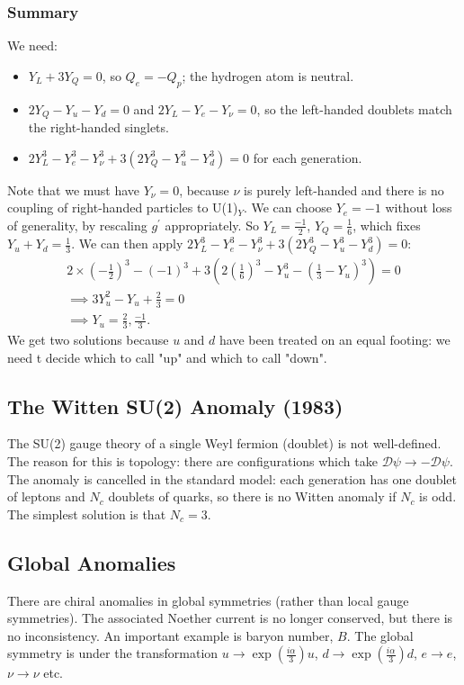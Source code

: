 \subsubsection{Summary}
We need:
\begin{itemize}
\item $Y_L + 3 Y_Q = 0$, so $Q_e = -Q_p$; the hydrogen atom is neutral.
\item $2Y_Q - Y_u - Y_d = 0$ and $2Y_L - Y_e - Y_\nu=0$, so the left-handed doublets match the right-handed singlets.
\item $2Y_L^3 - Y_e^3 - Y_\nu^3 + 3(2Y_Q^3 - Y_u^3 - Y_d^3) = 0$ for each generation.
\end{itemize}
Note that we must have $Y_\nu=0$, because $\nu$ is purely left-handed and there is no coupling of right-handed particles to U(1)$_Y$. We can choose $Y_e =-1$ without loss of generality, by rescaling $g^\prime$ appropriately. So $Y_L = \frac{-1}{2}$, $Y_Q=\frac{1}{6}$, which fixes $Y_u + Y_d = \frac{1}{3}$.  We can then apply $2Y_L^3 - Y_e^3 - Y_\nu^3 + 3(2Y_Q^3 - Y_u^3 - Y_d^3) = 0$:
\begin{equation}
\begin{split}
2\times(-\frac{1}{2})^3 - (-1)^3 + 3(2(\frac{1}{6})^3 - Y_u^3 - (\frac{1}{3} - Y_u)^3) = 0 \\
\implies 3Y_u^2 - Y_u + \frac{2}{3} = 0 \\
\implies Y_u = \frac{2}{3}, \frac{-1}{3}.
\end{split}
\end{equation} 
We get two solutions because $u$ and $d$ have been treated on an equal footing: we need t decide which to call "up" and which to call "down".
%
\subsection{The Witten SU(2) Anomaly (1983)}
%
The SU(2) gauge theory of a single Weyl fermion (doublet) is not well-defined. The reason for this is topology: there are configurations which take $\mathcal{D} \psi \to - \mathcal{D} \psi $. The anomaly is cancelled in the standard model: each generation has one doublet of leptons and $N_c$ doublets of quarks, so there is no Witten anomaly if $N_c$ is odd. The simplest solution is that $N_c=3$.
%
\subsection{Global Anomalies}
%
There are chiral anomalies in global symmetries (rather than local gauge symmetries). The associated Noether current is no longer conserved, but there is no inconsistency. An important example is baryon number, $B$. The global symmetry is under the transformation $u \to \exp(\frac{i\alpha}{3})u$, $d \to \exp(\frac{i\alpha}{3})d$, $e \to e$, $\nu \to \nu$ etc.

